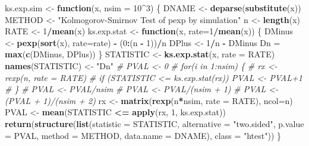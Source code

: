 \documentclass[
]{book}
\newenvironment{Shaded}{\begin{snugshade}}{\end{snugshade}}
\newcommand{\CommentTok}[1]{\textcolor[rgb]{0.56,0.35,0.01}{\textit{#1}}}
\newcommand{\ControlFlowTok}[1]{\textcolor[rgb]{0.13,0.29,0.53}{\textbf{#1}}}
\newcommand{\DataTypeTok}[1]{\textcolor[rgb]{0.13,0.29,0.53}{#1}}
\newcommand{\DecValTok}[1]{\textcolor[rgb]{0.00,0.00,0.81}{#1}}
\newcommand{\KeywordTok}[1]{\textcolor[rgb]{0.13,0.29,0.53}{\textbf{#1}}}
\newcommand{\NormalTok}[1]{#1}
\newcommand{\OperatorTok}[1]{\textcolor[rgb]{0.81,0.36,0.00}{\textbf{#1}}}
\newcommand{\StringTok}[1]{\textcolor[rgb]{0.31,0.60,0.02}{#1}}
\theoremstyle{break}
\theoremstyle{definition}
\theoremstyle{definition}
\theoremstyle{definition}
\theoremstyle{remark}
\begin{document}
\begin{enumerate}
\begin{Shaded}
\begin{Highlighting}[]
\NormalTok{ks.exp.sim <-}\StringTok{ }\ControlFlowTok{function}\NormalTok{(x, }\DataTypeTok{nsim =} \DecValTok{10}\OperatorTok{^}\DecValTok{3}\NormalTok{) \{}
\NormalTok{  DNAME <-}\StringTok{ }\KeywordTok{deparse}\NormalTok{(}\KeywordTok{substitute}\NormalTok{(x))}
\NormalTok{  METHOD <-}\StringTok{ "Kolmogorov-Smirnov Test of pexp by simulation"} 
\NormalTok{  n <-}\StringTok{ }\KeywordTok{length}\NormalTok{(x)}
\NormalTok{  RATE <-}\StringTok{ }\DecValTok{1}\OperatorTok{/}\KeywordTok{mean}\NormalTok{(x)}
\NormalTok{  ks.exp.stat <-}\StringTok{ }\ControlFlowTok{function}\NormalTok{(x, }\DataTypeTok{rate=}\DecValTok{1}\OperatorTok{/}\KeywordTok{mean}\NormalTok{(x)) \{}
\NormalTok{    DMinus <-}\StringTok{ }\KeywordTok{pexp}\NormalTok{(}\KeywordTok{sort}\NormalTok{(x), }\DataTypeTok{rate=}\NormalTok{rate) }\OperatorTok{-}\StringTok{ }\NormalTok{(}\DecValTok{0}\OperatorTok{:}\NormalTok{(n }\OperatorTok{-}\StringTok{ }\DecValTok{1}\NormalTok{))}\OperatorTok{/}\NormalTok{n}
\NormalTok{    DPlus <-}\StringTok{ }\DecValTok{1}\OperatorTok{/}\NormalTok{n }\OperatorTok{-}\StringTok{ }\NormalTok{DMinus}
\NormalTok{    Dn =}\StringTok{ }\KeywordTok{max}\NormalTok{(}\KeywordTok{c}\NormalTok{(DMinus, DPlus))}
\NormalTok{  \}  }
\NormalTok{  STATISTIC <-}\StringTok{ }\KeywordTok{ks.exp.stat}\NormalTok{(x, }\DataTypeTok{rate =}\NormalTok{ RATE) }
  \KeywordTok{names}\NormalTok{(STATISTIC) <-}\StringTok{ "Dn"}
  \CommentTok{# PVAL <- 0}
  \CommentTok{# for(i in 1:nsim) \{}
  \CommentTok{#   rx <- rexp(n, rate = RATE)}
  \CommentTok{#   if (STATISTIC <= ks.exp.stat(rx)) PVAL <- PVAL+1}
  \CommentTok{# \}}
  \CommentTok{# PVAL <- PVAL/nsim}
  \CommentTok{# PVAL <- PVAL/(nsim + 1)}
  \CommentTok{# PVAL <- (PVAL + 1)/(nsim + 2)}
\NormalTok{  rx <-}\StringTok{ }\KeywordTok{matrix}\NormalTok{(}\KeywordTok{rexp}\NormalTok{(n}\OperatorTok{*}\NormalTok{nsim, }\DataTypeTok{rate =}\NormalTok{ RATE), }\DataTypeTok{ncol=}\NormalTok{n)}
\NormalTok{  PVAL <-}\StringTok{ }\KeywordTok{mean}\NormalTok{(STATISTIC }\OperatorTok{<=}\StringTok{ }\KeywordTok{apply}\NormalTok{(rx, }\DecValTok{1}\NormalTok{, ks.exp.stat))}
  \KeywordTok{return}\NormalTok{(}\KeywordTok{structure}\NormalTok{(}\KeywordTok{list}\NormalTok{(}\DataTypeTok{statistic =}\NormalTok{ STATISTIC, }\DataTypeTok{alternative =} \StringTok{"two.sided"}\NormalTok{, }
                   \DataTypeTok{p.value =}\NormalTok{ PVAL, }\DataTypeTok{method =}\NormalTok{ METHOD, }\DataTypeTok{data.name =}\NormalTok{ DNAME), }
                   \DataTypeTok{class =} \StringTok{"htest"}\NormalTok{))}
\NormalTok{\}}
\end{Highlighting}
\end{Shaded}


\end{enumerate}
\end{document}
